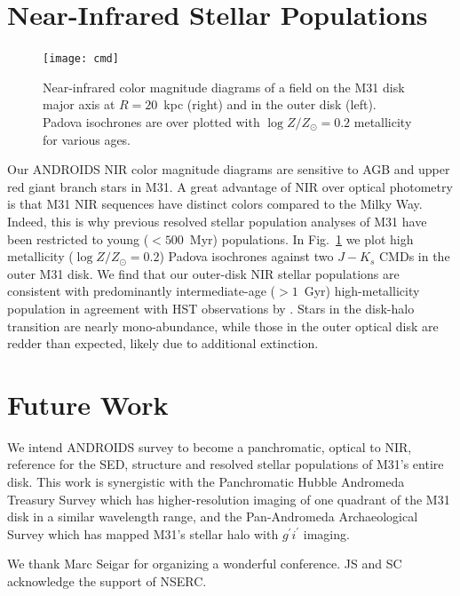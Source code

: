 \documentclass[11pt,twoside]{article}
\begin{document}
\section{Near-Infrared Stellar Populations}

\begin{figure}[t]
\centering
\texttt{[image: cmd]}
\caption{Near-infrared color magnitude diagrams of a field on the M31 disk major axis at $R=20$~kpc (right) and in the outer disk (left). Padova isochrones are over plotted with $\log Z/Z_\odot=0.2$ metallicity for various ages.}
\label{fig:cmd}
\end{figure}

Our ANDROIDS NIR color magnitude diagrams are sensitive to AGB and upper red giant branch stars in M31.
A great advantage of NIR over optical photometry is that M31 NIR sequences have distinct colors compared to the Milky Way.
Indeed, this is why previous resolved stellar population analyses of M31 \citep[e.g.,][]{Williams:2003} have been restricted to young ($<500$~Myr) populations.
In Fig.~\ref{fig:cmd} we plot high metallicity ($\log Z/Z_\odot = 0.2$) Padova isochrones \citep{Marigo:2008} against two $J-K_s$ CMDs in the outer M31 disk.
We find that our outer-disk NIR stellar populations are consistent with predominantly intermediate-age ($>1$~Gyr) high-metallicity population in agreement with HST observations by \cite{Brown:2006}.
Stars in the disk-halo transition are nearly mono-abundance, while those in the outer optical disk are redder than expected, likely due to additional extinction.

\section{Future Work}

We intend ANDROIDS survey to become a panchromatic, optical to NIR, reference for the SED, structure and resolved stellar populations of M31's entire disk.
This work is synergistic with the Panchromatic Hubble Andromeda Treasury Survey \citep{Dalcanton:2012} which has higher-resolution imaging of one quadrant of the M31 disk in a similar wavelength range, and the Pan-Andromeda Archaeological Survey \citep{McConnachie:2009} which has mapped M31's stellar halo with $g^\prime i^\prime$ imaging.

\acknowledgements We thank Marc Seigar for organizing a wonderful conference. JS and SC acknowledge the support of NSERC.


\end{document}
